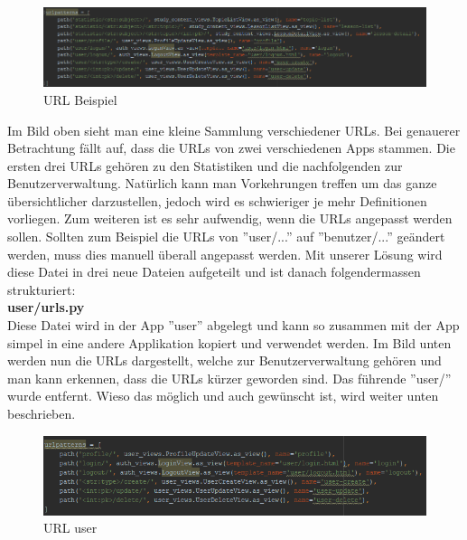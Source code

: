 \begin{minipage}{\textwidth}
	\begin{figure}[H]
		\includegraphics[width=\textwidth, height=\textheight, keepaspectratio]{images/URLschlecht.png}
		\caption{URL Beispiel}
	\end{figure}
\end{minipage}

\noindent Im Bild oben sieht man eine kleine Sammlung verschiedener URLs. Bei genauerer Betrachtung fällt auf, dass die URLs von zwei verschiedenen Apps stammen. Die ersten drei URLs gehören zu den Statistiken und die nachfolgenden zur Benutzerverwaltung. Natürlich kann man Vorkehrungen treffen um das ganze übersichtlicher darzustellen, jedoch wird es schwieriger je mehr Definitionen vorliegen. Zum weiteren ist es sehr aufwendig, wenn die URLs angepasst werden sollen. Sollten zum Beispiel die URLs von ''user/...'' auf ''benutzer/...'' geändert werden, muss dies manuell überall angepasst werden. 
Mit unserer Lösung wird diese Datei in drei neue Dateien aufgeteilt und ist danach folgendermassen strukturiert: \\

\noindent \textbf{user/urls.py} \\
Diese Datei wird in der App ''user'' abgelegt und kann so zusammen mit der App simpel in eine andere Applikation kopiert und verwendet werden. Im Bild unten werden nun die URLs dargestellt, welche zur Benutzerverwaltung gehören und man kann erkennen, dass die URLs kürzer geworden sind. Das führende ''user/'' wurde entfernt. Wieso das möglich und auch gewünscht ist, wird weiter unten beschrieben. \\
\begin{minipage}{\textwidth}
	\begin{figure}[H]
		\includegraphics[width=\textwidth, height=\textheight, keepaspectratio]{images/URLuser.png}
		\caption{URL user}
	\end{figure}
\end{minipage}


